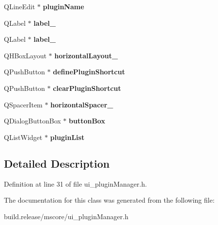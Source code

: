 \begin{DoxyCompactItemize}
Q\+Line\+Edit $\ast$ {\bfseries plugin\+Name}
\item 
\mbox{\label{class_ui___plugin_manager_ab77e5ad0854bb84cd77f035e3f7cb7c8}} 
Q\+Label $\ast$ {\bfseries label\+\_}
\item 
\mbox{\label{class_ui___plugin_manager_a31c329c2a6b20ba50db71caf217b9c8d}} 
Q\+Label $\ast$ {\bfseries label\+\_}
\item 
\mbox{\label{class_ui___plugin_manager_ac4d62f00e9d206974f26d8062b27f054}} 
Q\+H\+Box\+Layout $\ast$ {\bfseries horizontal\+Layout\+\_}
\item 
\mbox{\label{class_ui___plugin_manager_addb1de048d7561471934a47fc7829d9e}} 
Q\+Push\+Button $\ast$ {\bfseries define\+Plugin\+Shortcut}
\item 
\mbox{\label{class_ui___plugin_manager_a6e1d0955d222a1c089d084be0fae377d}} 
Q\+Push\+Button $\ast$ {\bfseries clear\+Plugin\+Shortcut}
\item 
\mbox{\label{class_ui___plugin_manager_a42d82f9ecebd1003b7f75e2d10dcdaf4}} 
Q\+Spacer\+Item $\ast$ {\bfseries horizontal\+Spacer\+\_}
\item 
\mbox{\label{class_ui___plugin_manager_aec2ff33a2c66fb8e548e671ae5182e44}} 
Q\+Dialog\+Button\+Box $\ast$ {\bfseries button\+Box}
\item 
\mbox{\label{class_ui___plugin_manager_ac676fa83c8ae437a5e1c44d5baec1e33}} 
Q\+List\+Widget $\ast$ {\bfseries plugin\+List}
\end{DoxyCompactItemize}


\subsection{Detailed Description}


Definition at line 31 of file ui\+\_\+plugin\+Manager.\+h.



The documentation for this class was generated from the following file\+:\begin{DoxyCompactItemize}
\item 
build.\+release/mscore/ui\+\_\+plugin\+Manager.\+h\end{DoxyCompactItemize}
